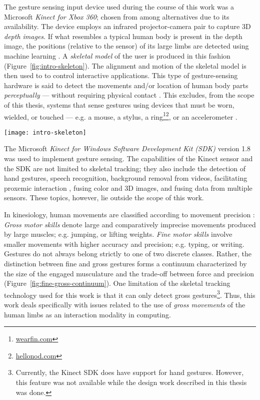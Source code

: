 The gesture sensing input device used during the course of this work was a Microsoft \emph{Kinect for Xbox 360}; chosen from among alternatives due to its availability. The device employs an infrared projector-camera pair to capture 3D \emph{depth images}. If what resembles a typical human body is present in the depth image, the positions (relative to the sensor) of its large limbs are detected using machine learning \parencite{Girshick:2011, Shotton:2011, Shotton:2012, Shotton:2013}. A \emph{skeletal model} of the user is produced in this fashion (Figure~\ref{fig:intro-skeleton}). The alignment and motion of the skeletal model is then used to to control interactive applications. This type of gesture-sensing hardware is said to detect the movements and/or location of human body parts \emph{perceptually} --- without requiring physical contact \parencite{Turk:2000, Crowley:2000}. This excludes, from the scope of this thesis, systems that sense gestures using devices that must be worn, wielded, or touched --- e.g. a mouse, a stylus, a ring\footnote{\href{http://www.wearfin.com/}{wearfin.com}}\footnote{\href{https://www.hellonod.com/}{hellonod.com}}, or an accelerometer \parencite{Kela:2006, Ashbrook:2010}.

\begin{SCfigure}[\sidecaptionrelwidth][ht]
\centering
\texttt{[image: intro-skeleton]}
\caption{The Microsoft Kinect sensor employs an infrared projector-camera pair to capture 3D depth images, and fits a skeletal model onto what resembles a  human body in the image.}
\label{fig:intro-skeleton}
\end{SCfigure}

The Microsoft \emph{Kinect for Windows Software Development Kit (SDK)} version 1.8 was used to implement gesture sensing. The capabilities of the Kinect sensor and the SDK are not limited to skeletal tracking; they also include the detection of hand gestures, speech recognition, background removal from videos, facilitating proxemic interaction \parencite{Ballendat:2010}, fusing color and 3D images, and fusing data from multiple sensors. These topics, however, lie outside the scope of this work.

In kinesiology, human movements are classified according to movement precision \parencite{Haibach:2011}: \emph{Gross motor skills} denote large and comparatively imprecise movements produced by large muscles; e.g. jumping, or lifting weights. \emph{Fine motor skills} involve smaller movements with higher accuracy and precision; e.g. typing, or writing. Gestures do not always belong strictly to one of two discrete classes. Rather, the distinction between fine and gross gestures forms a continuum characterized by the size of the engaged musculature and the trade-off between force and precision \parencite{Edwards:2010} (Figure~\ref{fig:fine-gross-continuum}). One limitation of the skeletal tracking technology used for this work is that it can only detect gross gestures\footnote{Currently, the Kinect SDK does have support for hand gestures. However, this feature was not available while the design work described in this thesis was done.}. Thus, this work deals specifically with issues related to the use of \emph{gross movements} of the human limbs as an interaction modality in computing.

